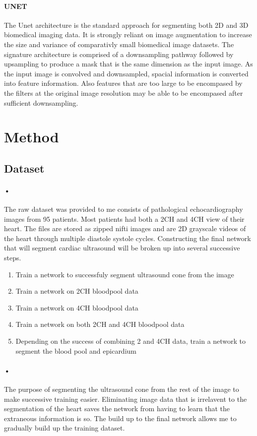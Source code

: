 \documentclass{article}
\begin{document}
{\paragraph{UNET}
The Unet architecture is the standard approach for segmenting both 2D and 3D biomedical imaging data.
It is strongly reliant on image augmentation to increase the size and variance of comparativly small biomedical image datasets.
The signature architecture is comprised of a downsampling pathway followed by upsampling to produce a mask that is the same dimension as the input image.
As the input image is convolved and downsampled, spacial information is converted into feature information.
Also features that are too large to be encompased by the filters at the original image resolution may be able to be encompased after sufficient downsampling.
\section{Method}
\subsection{Dataset}
\paragraph{•}
The raw dataset was provided to me consists of pathological echocardiography images from 95 patients. 
Most patients had both a 2CH and 4CH view of their heart. The files are stored as zipped nifti images and are 2D grayscale videos of the heart through multiple diastole systole cycles.
Constructing the final network that will segment cardiac ultrasound will be broken up into several successive steps.

\begin{enumerate}
\item Train a network to successfuly segment ultrasound cone from the image
\item Train a network on 2CH bloodpool data
\item Train a network on 4CH bloodpool data
\item Train a network on both 2CH and 4CH bloodpool data
\item Depending on the success of combining 2 and 4CH data, train a network to segment the blood pool and epicardium

\end{enumerate}
\paragraph{•}
The purpose of segmenting the ultrasound cone from the rest of the image to make successive training easier.
Eliminating image data that is irrelavent to the segmentation of the heart saves the network from having to learn that the extraneous information is so. The build up to the final network allows me to gradually build up the training dataset.


}
\end{document}
